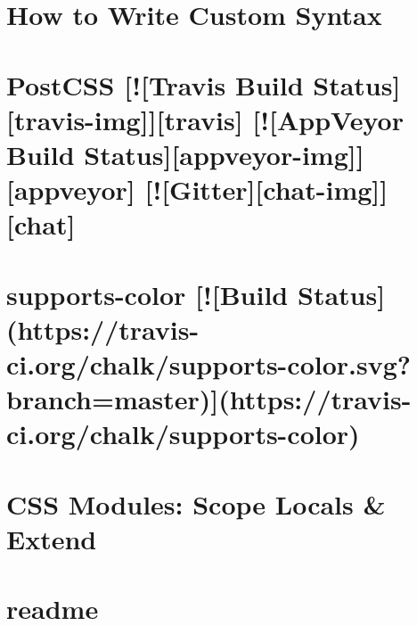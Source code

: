 \documentclass[twoside]{book}
\newcommand{\+}{\discretionary{\mbox{\scriptsize$\hookleftarrow$}}{}{}}
\begin{document}
\chapter{How to Write Custom Syntax}
\label{md__c_1_workspace_demo_src_main_script_node_modules_postcss-modules-scope_node_modules_postcss_docs_syntax}

\chapter{Post\+C\+SS \mbox{[}!\mbox{[}Travis Build Status\mbox{]}\mbox{[}travis-\/img\mbox{]}\mbox{]}\mbox{[}travis\mbox{]} \mbox{[}!\mbox{[}App\+Veyor Build Status\mbox{]}\mbox{[}appveyor-\/img\mbox{]}\mbox{]}\mbox{[}appveyor\mbox{]} \mbox{[}!\mbox{[}Gitter\mbox{]}\mbox{[}chat-\/img\mbox{]}\mbox{]}\mbox{[}chat\mbox{]}}
\label{md__c_1_workspace_demo_src_main_script_node_modules_postcss-modules-scope_node_modules_postcss__r_e_a_d_m_e}

\chapter{supports-\/color \mbox{[}!\mbox{[}Build Status\mbox{]}(https\+://travis-\/ci.org/chalk/supports-\/color.svg?branch=master)\mbox{]}(https\+://travis-\/ci.org/chalk/supports-\/color)}
\label{md__c_1_workspace_demo_src_main_script_node_modules_postcss-modules-scope_node_modules_supports-color_readme}

\chapter{C\+SS Modules\+: Scope Locals \& Extend}
\label{md__c_1_workspace_demo_src_main_script_node_modules_postcss-modules-scope__r_e_a_d_m_e}

\chapter{readme}
\label{md__c_1_workspace_demo_src_main_script_node_modules_postcss-modules-values_node_modules_chalk_readme}

\end{document}

